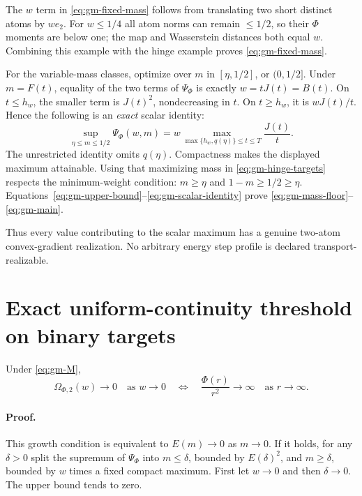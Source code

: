 The \(w\) term in \eqref{eq:gm-fixed-mass} follows from translating two short distinct atoms by \(we_2\). For \(w\le1/4\) all atom norms can remain \(\le1/2\), so their \(\Phi\) moments are below one; the map and Wasserstein distances both equal \(w\). Combining this example with the hinge example proves \eqref{eq:gm-fixed-mass}.

For the variable-mass classes, optimize over \(m\) in \([\eta,1/2]\), or \((0,1/2]\). Under \(m=F(t)\), equality of the two terms of \(\Psi_\Phi\) is exactly \(w=tJ(t)=B(t)\). On \(t\le h_w\), the smaller term is \(J(t)^2\), nondecreasing in \(t\). On \(t\ge h_w\), it is \(wJ(t)/t\). Hence the following is an \emph{exact} scalar identity:
\begin{equation}
 \sup_{\eta\le m\le1/2}\Psi_\Phi(w,m)
 =w\max_{\max\{h_w,q(\eta)\}\le t\le T}\frac{J(t)}t.
 \tag{4.3}\label{eq:gm-scalar-identity}
\end{equation}
The unrestricted identity omits \(q(\eta)\). Compactness makes the displayed maximum attainable. Using that maximizing mass in \eqref{eq:gm-hinge-targets} respects the minimum-weight condition: \(m\ge\eta\) and \(1-m\ge1/2\ge\eta\). Equations~\eqref{eq:gm-upper-bound}--\eqref{eq:gm-scalar-identity} prove \eqref{eq:gm-mass-floor}--\eqref{eq:gm-main}.

Thus every value contributing to the scalar maximum has a genuine two-atom convex-gradient realization. No arbitrary energy step profile is declared transport-realizable.

\section{Exact uniform-continuity threshold on binary targets}\label{sec:gm-continuity}

Under \eqref{eq:gm-M},
\begin{equation}
 \Omega_{\Phi,2}(w)\longrightarrow0\quad\text{as }w\to0
 \quad\Longleftrightarrow\quad
 \frac{\Phi(r)}{r^2}\longrightarrow\infty\quad\text{as }r\to\infty.
 \tag{5.1}\label{eq:gm-continuity}
\end{equation}
\paragraph{Proof.}
This growth condition is equivalent to \(E(m)\to0\) as \(m\to0\). If it holds, for any \(\delta>0\) split the supremum of \(\Psi_\Phi\) into \(m\le\delta\), bounded by \(E(\delta)^2\), and \(m\ge\delta\), bounded by \(w\) times a fixed compact maximum. First let \(w\to0\) and then \(\delta\to0\). The upper bound tends to zero.

